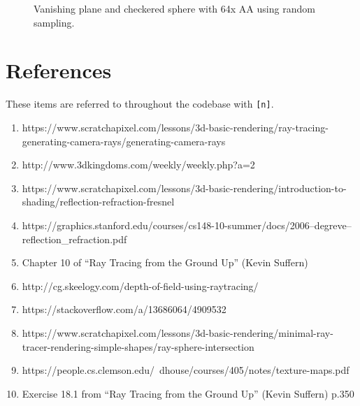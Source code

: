 \documentclass{article}
\begin{document}
\begin{figure}[H]
    \centering
    \caption{Vanishing plane and checkered sphere with 64x AA using random sampling.}
\end{figure}

\section{References}

These items are referred to throughout the codebase with \texttt{[n]}.

\begin{enumerate}
    \item https://www.scratchapixel.com/lessons/3d-basic-rendering/ray-tracing-generating-camera-rays/generating-camera-rays
    \item http://www.3dkingdoms.com/weekly/weekly.php?a=2
    \item https://www.scratchapixel.com/lessons/3d-basic-rendering/introduction-to-shading/reflection-refraction-fresnel
    \item https://graphics.stanford.edu/courses/cs148-10-summer/docs/2006--degreve--reflection\_refraction.pdf
    \item Chapter 10 of ``Ray Tracing from the Ground Up'' (Kevin Suffern)
    \item http://cg.skeelogy.com/depth-of-field-using-raytracing/
    \item https://stackoverflow.com/a/13686064/4909532
    \item https://www.scratchapixel.com/lessons/3d-basic-rendering/minimal-ray-tracer-rendering-simple-shapes/ray-sphere-intersection
    \item https://people.cs.clemson.edu/~dhouse/courses/405/notes/texture-maps.pdf
    \item Exercise 18.1 from ``Ray Tracing from the Ground Up'' (Kevin Suffern) p.350
\end{enumerate}
\end{document}
